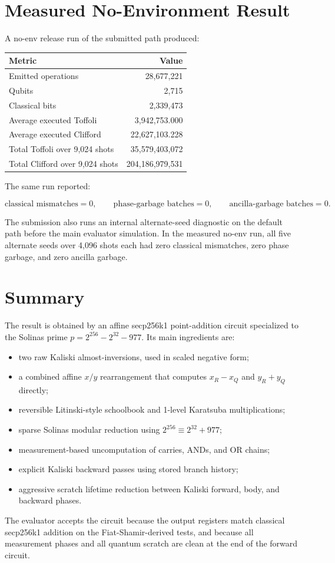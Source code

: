 \documentclass[11pt]{article}
\begin{document}
\section{Measured No-Environment Result}

A no-env release run of the submitted path produced:

\begin{center}
\begin{tabular}{lr}
\toprule
Metric & Value \\
\midrule
Emitted operations & 28,677,221 \\
Qubits & 2,715 \\
Classical bits & 2,339,473 \\
Average executed Toffoli & 3,942,753.000 \\
Average executed Clifford & 22,627,103.228 \\
Total Toffoli over 9,024 shots & 35,579,403,072 \\
Total Clifford over 9,024 shots & 204,186,979,531 \\
\bottomrule
\end{tabular}
\end{center}

The same run reported:

\[
\text{classical mismatches}=0,
\qquad
\text{phase-garbage batches}=0,
\qquad
\text{ancilla-garbage batches}=0.
\]

The submission also runs an internal alternate-seed diagnostic on the default
path before the main evaluator simulation.  In the measured no-env run, all five
alternate seeds over 4,096 shots each had zero classical mismatches, zero phase
garbage, and zero ancilla garbage.

\section{Summary}

The result is obtained by an affine secp256k1 point-addition circuit specialized
to the Solinas prime \(p=2^{256}-2^{32}-977\).  Its main ingredients are:

\begin{itemize}
  \item two raw Kaliski almost-inversions, used in scaled negative form;
  \item a combined affine \(x/y\) rearrangement that computes \(x_R-x_Q\) and
        \(y_R+y_Q\) directly;
  \item reversible Litinski-style schoolbook and 1-level Karatsuba
        multiplications;
  \item sparse Solinas modular reduction using
        \(2^{256}\equiv 2^{32}+977\);
  \item measurement-based uncomputation of carries, ANDs, and OR chains;
  \item explicit Kaliski backward passes using stored branch history;
  \item aggressive scratch lifetime reduction between Kaliski forward, body,
        and backward phases.
\end{itemize}

The evaluator accepts the circuit because the output registers match classical
secp256k1 addition on the Fiat-Shamir-derived tests, and because all measurement
phases and all quantum scratch are clean at the end of the forward circuit.
\end{document}
